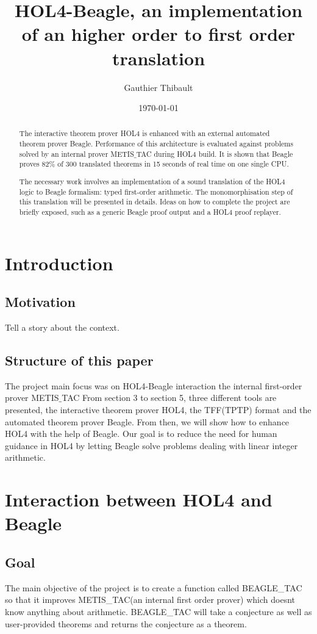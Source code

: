 \documentclass[a4paper, 11pt]{article}
\title{HOL4-Beagle, an implementation of an higher order to first order translation}
\author{Gauthier Thibault}
\date{\today}
\theoremstyle{plain}
\theoremstyle{definition}
\theoremstyle{remark}
\begin{document}
\maketitle 
\begin{abstract}
\par The interactive theorem prover HOL4 is enhanced with an external automated theorem prover Beagle. Performance of this architecture is evaluated against problems solved by an internal prover METIS$\_$TAC during HOL4 build. It is shown that Beagle proves 82$\%$ of 300 translated theorems in 15 seconds of real time on one single CPU.
\par The necessary work involves an implementation of a sound translation of the HOL4 logic to Beagle formalism: typed first-order arithmetic. The monomorphisation step of this translation will be presented in details. Ideas on how to complete the project are briefly exposed, such as a generic Beagle proof output and a HOL4 proof replayer. 
\end{abstract}

\pagebreak
\tableofcontents
\pagebreak
\section{Introduction}

\subsection{Motivation}
Tell a story about the context.

\subsection{Structure of this paper}
The project main focus was on HOL4-Beagle interaction
 the internal first-order prover METIS$\_$TAC 
From section 3 to section 5, three different tools are presented, the interactive theorem prover HOL4, the TFF(TPTP) format and the automated theorem prover Beagle. From then, we will show how to enhance HOL4 with the help of Beagle. Our goal is to reduce the need for human guidance in HOL4 by letting Beagle solve problems dealing with linear integer arithmetic.
 
\section{Interaction between HOL4 and Beagle}
\subsection{Goal}  
  The main objective of the project is to create a function called BEAGLE{\_}TAC so that it improves METIS{\_}TAC(an internal first order prover) which doesnt know anything about arithmetic.
  BEAGLE{\_}TAC will take a conjecture as well as user-provided theorems and returns the conjecture as a theorem.
 
\end{document}
